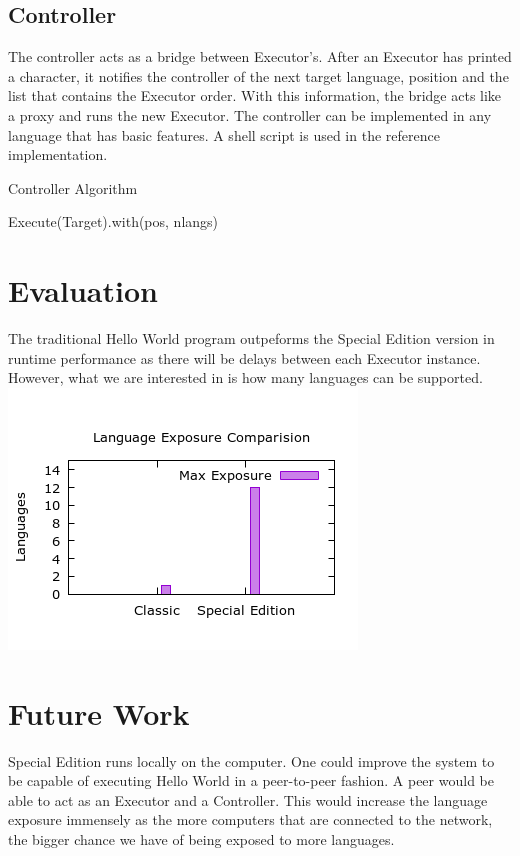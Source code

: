 \documentclass[11pt]{article}
\begin{document}
\subsection{Controller}
The controller acts as a bridge between Executor's. After an Executor has printed a character, it notifies the controller of the next target language, position and the list that contains the Executor order. With this information, the bridge acts like a proxy and runs the new Executor. The controller can be implemented in any language that has basic features. A shell script is used in the reference implementation.
\vfill
\raggedbottom

\begin{algorithm}[H]
\caption{Controller Algorithm}
\label{Special Edition}
\begin{algorithmic}[2]
	\State Execute(Target).with(pos, nlangs)
\EndProcedure
\end{algorithmic}
\end{algorithm}

\section{Evaluation}
The traditional Hello World program outpeforms the Special Edition version in runtime performance as there will be delays between each Executor instance. However, what we are interested in is how many languages can be supported.
\includegraphics[scale=0.65]{img/exposure.png}


\section{Future Work}
Special Edition runs locally on the computer. One could improve the system to be capable of executing Hello World in a peer-to-peer fashion. A peer would be able to act as an Executor and a Controller. This would increase the language exposure immensely as the more computers that are connected to the network, the bigger chance we have of being exposed to more languages.
\end{document}

